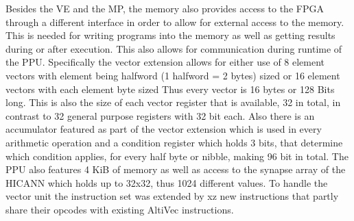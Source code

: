 Besides the VE and the MP, the memory also provides access to the FPGA through a different interface  in order to allow for external access to the memory.
This is needed for writing programs into the memory as well as getting results during or after execution.
This also allows for communication during runtime of the PPU.
Specifically the vector extension allows for either use of 8 element vectors with element being halfword (1 halfword = 2 bytes) sized or 16 element vectors with each element byte sized
Thus every vector is 16 bytes or 128 Bits long.
This is also the size of each vector register that is available, 32 in total, in contrast to 32 general purpose registers with 32 bit each.
Also there is an accumulator featured as part of the vector extension which is used in every arithmetic operation and a condition register which holds 3 bits, that determine which condition applies, for every half byte or nibble, making 96 bit in total.
The PPU also features 4 KiB of memory as well as access to the synapse array of the HICANN which holds up to 32x32, thus 1024 different values.
To handle the vector unit the instruction set was extended by xz  new instructions that partly share their opcodes with existing AltiVec instructions.

